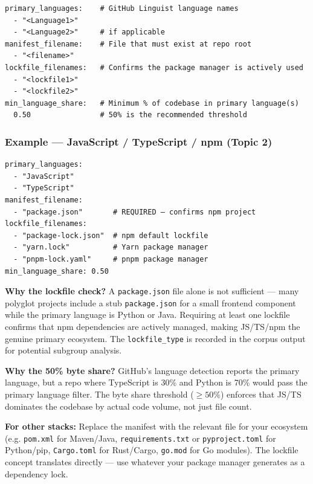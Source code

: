 \documentclass[11pt,a4paper]{article}
\begin{document}
\begin{lstlisting}
primary_languages:    # GitHub Linguist language names
  - "<Language1>"
  - "<Language2>"     # if applicable
manifest_filename:    # File that must exist at repo root
  - "<filename>"
lockfile_filenames:   # Confirms the package manager is actively used
  - "<lockfile1>"
  - "<lockfile2>"
min_language_share:   # Minimum % of codebase in primary language(s)
  0.50                # 50% is the recommended threshold
\end{lstlisting}

\subsubsection{Example — JavaScript / TypeScript / npm (Topic 2)}

\begin{lstlisting}
primary_languages:
  - "JavaScript"
  - "TypeScript"
manifest_filename:
  - "package.json"       # REQUIRED — confirms npm project
lockfile_filenames:
  - "package-lock.json"  # npm default lockfile
  - "yarn.lock"          # Yarn package manager
  - "pnpm-lock.yaml"     # pnpm package manager
min_language_share: 0.50
\end{lstlisting}

\textbf{Why the lockfile check?} A \texttt{package.json} file alone is not sufficient — many polyglot projects include a stub \texttt{package.json} for a small frontend component while the primary language is Python or Java. Requiring at least one lockfile confirms that npm dependencies are actively managed, making JS/TS/npm the genuine primary ecosystem. The \texttt{lockfile\_type} is recorded in the corpus output for potential subgroup analysis.

\textbf{Why the 50\% byte share?} GitHub's language detection reports the primary language, but a repo where TypeScript is 30\% and Python is 70\% would pass the primary language filter. The byte share threshold ($\geq50\%$) enforces that JS/TS dominates the codebase by actual code volume, not just file count.

\begin{notebox}
\textbf{For other stacks:} Replace the manifest with the relevant file for your ecosystem (e.g. \texttt{pom.xml} for Maven/Java, \texttt{requirements.txt} or \texttt{pyproject.toml} for Python/pip, \texttt{Cargo.toml} for Rust/Cargo, \texttt{go.mod} for Go modules). The lockfile concept translates directly — use whatever your package manager generates as a dependency lock.
\end{notebox}
\end{document}
